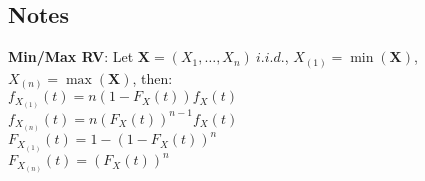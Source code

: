 \documentclass[8pt,a4paper]{extarticle}     %
\newcommand{\colfill}{\vfill\eject\columnbreak}
\renewcommand{\vec}[1]{\mathbf{#1}}
\begin{document}
\begin{multicols}{4}
\section{Notes} 
\begin{listb}
	\item \textbf{Min/Max RV}: Let $\vec{X}=(X_1,\dots,X_n) \ i.i.d.$, $X_{(1)}=\min(\vec{X})$, $X_{(n)}=\max(\vec{X})$, then: \\
	$f_{X_{(1)}}(t)=n(1-F_X(t))f_X(t)$\\ 
	$f_{X_{(n)}}(t)=n(F_X(t))^{n-1}f_X(t)$\\
	$F_{X_{(1)}}(t)=1-(1-F_X(t))^n$\\
	$F_{X_{(n)}}(t)=(F_X(t))^n$
\end{listb}

\colfill

\fi 

\end{multicols}
\end{document}
